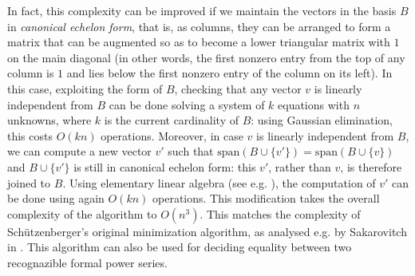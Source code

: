 \documentclass[3p]{elsarticle}
\newcommand{\cbox}[1]{\vspace{0.2cm}\noindent
  \fbox{\parbox{.97\textwidth}{#1}}\vspace{0.2cm}}
\newcommand{\Span}{\mathrm{span}}  %
\begin{document}
In fact, this complexity can be improved if we maintain the vectors in the  basis $B$ in \emph{canonical echelon form}, that is, as columns,
they can be arranged  to form   a   matrix that can be augmented so as to become a lower triangular matrix with $1$ on the main diagonal
(in other words,    the first nonzero entry from the top  of any column is $1$ and  lies   below the  first nonzero entry  of the column
on its left). In this case, exploiting the form of $B$, checking that  any vector $v$ is linearly independent from $B$ can be done solving  a system of $k$ equations with $n$ unknowns,  where $k$ is the current cardinality of $B$: using Gaussian elimination, this    costs   $O(kn)$ operations.  Moreover, in case $v$ is linearly independent  from $B$, we can compute a new vector $v'$ such that $\Span(B\cup\{v'\}) = \Span(B\cup\{v\})$  and $B\cup\{v'\}$ is still in canonical echelon form: this $v'$, rather than $v$, is therefore joined to $B$. Using elementary   linear algebra (see e.g. \cite{Saad}), the computation of $v'$ can be done using again $O(kn)$ operations. This modification takes the overall complexity of the algorithm to $O(n^3)$. This matches the complexity of     Sch\"{u}tzenberger's original  minimization algorithm,  as analysed  e.g. by Sakarovitch in \cite[Ch.4]{wahandbook}. This algorithm  can also be used  for deciding  equality between two recognazible formal power series.




\end{document}
